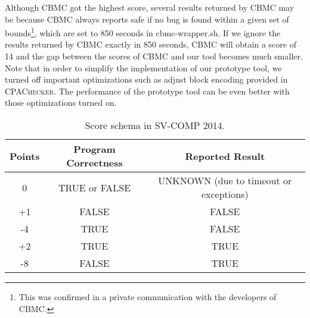Although CBMC got the highest score, several results returned by CBMC
may be  because CBMC always reports safe if no bug is found
within a given set of bounds\footnote{This was confirmed in a private
  communication with the developers of CBMC.}, which are set to 850
seconds in cbmc-wrapper.sh.
If we ignore the results returned by CBMC exactly in 850 seconds, CBMC 
will obtain a score of 14 and the gap between the scores of CBMC and
our tool becomes much smaller.
Note that in order to simplify the implementation of our prototype
tool, we turned off important optimizations such as adjust block
encoding provided in \textsc{CPAChecker}.
The performance of the prototype tool can be even better with those
optimizations turned on.

\begin{table}
\caption{Score schema in SV-COMP 2014.\label{table:score-schema}}
\begin{center}
\begin{tabular}{|c|c|c|}
\hline
Points & Program Correctness & Reported Result \\\hline
0      & TRUE or FALSE & UNKNOWN (due to timeout or exceptions) \\
+1     & FALSE         & FALSE \\
-4     & TRUE          & FALSE \\
+2     & TRUE          & TRUE \\
-8     & FALSE         & TRUE \\\hline
\end{tabular}
\end{center}
\end{table}

